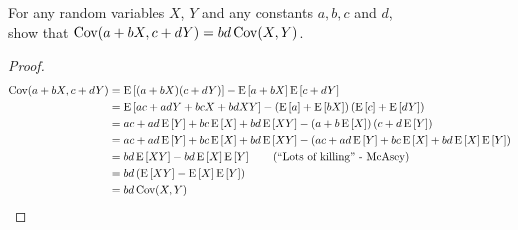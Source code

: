 For any random variables $X$, $Y$ and any constants $a, b, c$ and $d$,
\\show that $\operatorname{Cov}(a+bX, c+dY) = bd \operatorname{Cov}(X,Y)$.

\begin{proof}
    \begin{align*}
        \Cov(a+bX, c+dY) &= \Eb{(a+bX)(c+dY)} - \Eb{a+bX}\Eb{c+dY}\\
        &= \Eb{ac+adY+bcX+bdXY} - \pars{\Eb{a}+\Eb{bX}}\pars{\Eb{c}+\Eb{dY} }\\
        &= ac + ad\Eb{Y} + bc\Eb{X} + bd\Eb{XY} - \pars{a + b\Eb{X}}\pars{c + d\Eb{Y}}\\
        &= ac + ad\Eb{Y} + bc\Eb{X} + bd\Eb{XY} - \pars{ac + ad\Eb{Y} + bc\Eb{X} + bd\Eb{X}\Eb{Y}}\\
        &= bd\Eb{XY} - bd\Eb{X}\Eb{Y} \tag{\say{Lots of killing} - McAsey}\\
        &= bd\pars{\Eb{XY} - \Eb{X}\Eb{Y}}\\
        &= bd \Cov(X,Y)
    \end{align*}
\end{proof}